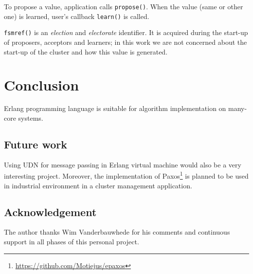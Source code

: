 \documentclass[english,11pt]{l4proj}
\begin{document}
To propose a value, application calls {\tt propose()}. When the value (same or
other one) is learned, user's callback {\tt learn()} is called.

{\tt fsmref()} is an \emph{election} and \emph{electorate} identifier. It is
acquired during the start-up of proposers, acceptors and learners; in this work
we are not concerned about the start-up of the cluster and how this value is
generated.

\section{Conclusion}
\label{sec:conclusion}

Erlang programming language is suitable for algorithm implementation on
many-core systems.

\subsection{Future work}
\label{sec:future-work}

Using UDN for message passing in Erlang virtual machine would also be a very
interesting project. Moreover, the implementation of
Paxos\footnote{\url{https://github.com/Motiejus/epaxos}} is planned to be used
in industrial environment in a cluster management application.

\subsection{Acknowledgement}

The author thanks Wim Vanderbauwhede for his comments and continuous support in
all phases of this personal project.
\end{document}
